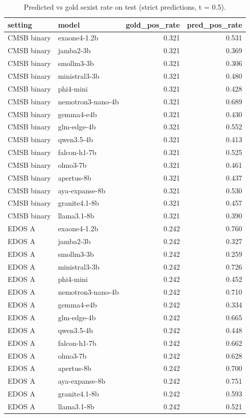 \begin{table}[t]
\caption{Predicted vs gold sexist rate on test (strict predictions, t = 0.5).}
\label{tab:positive_rate}
\begin{tabular}{llrr}
\toprule
setting & model & gold_pos_rate & pred_pos_rate \\
\midrule
CMSB binary & exaone4-1.2b & 0.321 & 0.531 \\
CMSB binary & jamba2-3b & 0.321 & 0.369 \\
CMSB binary & smollm3-3b & 0.321 & 0.306 \\
CMSB binary & ministral3-3b & 0.321 & 0.480 \\
CMSB binary & phi4-mini & 0.321 & 0.428 \\
CMSB binary & nemotron3-nano-4b & 0.321 & 0.689 \\
CMSB binary & gemma4-e4b & 0.321 & 0.430 \\
CMSB binary & glm-edge-4b & 0.321 & 0.552 \\
CMSB binary & qwen3.5-4b & 0.321 & 0.413 \\
CMSB binary & falcon-h1-7b & 0.321 & 0.525 \\
CMSB binary & olmo3-7b & 0.321 & 0.461 \\
CMSB binary & apertus-8b & 0.321 & 0.437 \\
CMSB binary & aya-expanse-8b & 0.321 & 0.530 \\
CMSB binary & granite4.1-8b & 0.321 & 0.457 \\
CMSB binary & llama3.1-8b & 0.321 & 0.390 \\
EDOS A & exaone4-1.2b & 0.242 & 0.760 \\
EDOS A & jamba2-3b & 0.242 & 0.327 \\
EDOS A & smollm3-3b & 0.242 & 0.259 \\
EDOS A & ministral3-3b & 0.242 & 0.726 \\
EDOS A & phi4-mini & 0.242 & 0.452 \\
EDOS A & nemotron3-nano-4b & 0.242 & 0.710 \\
EDOS A & gemma4-e4b & 0.242 & 0.334 \\
EDOS A & glm-edge-4b & 0.242 & 0.665 \\
EDOS A & qwen3.5-4b & 0.242 & 0.448 \\
EDOS A & falcon-h1-7b & 0.242 & 0.662 \\
EDOS A & olmo3-7b & 0.242 & 0.628 \\
EDOS A & apertus-8b & 0.242 & 0.700 \\
EDOS A & aya-expanse-8b & 0.242 & 0.751 \\
EDOS A & granite4.1-8b & 0.242 & 0.593 \\
EDOS A & llama3.1-8b & 0.242 & 0.521 \\
\bottomrule
\end{tabular}
\end{table}
